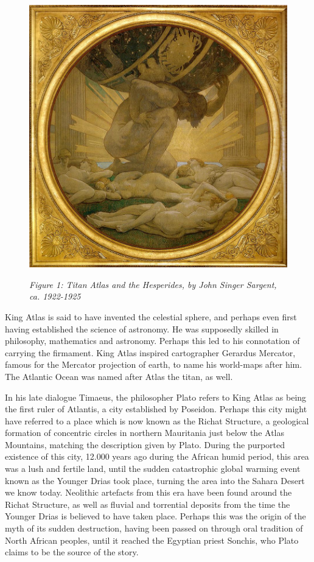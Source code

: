 \begin{figure}
\includegraphics[scale=0.1]{./Images/Atlas.jpeg}
 

\textit{Figure 1: Titan Atlas and the Hesperides, by John Singer Sargent, ca. 1922-1925}
\end{figure}

King Atlas is said to have invented the celestial sphere, and perhaps even first having established the science of astronomy. He was supposedly skilled in philosophy, mathematics and astronomy. Perhaps this led to his connotation of carrying the firmament. King Atlas inspired cartographer Gerardus Mercator, famous for the Mercator projection of earth, to name his world-maps after him. The Atlantic Ocean was named after Atlas the titan, as well.  

In his late dialogue Timaeus, the philosopher Plato refers to King Atlas as being the first ruler of Atlantis, a city established by Poseidon. Perhaps this city might have referred to a place which is now known as the Richat Structure, a geological formation of concentric circles in northern Mauritania just below the Atlas Mountains, matching the description given by Plato. During the purported existence of this city, 12.000 years ago during the African humid period, this area was a lush and fertile land, until the sudden catastrophic global warming event known as the Younger Drias took place, turning the area into the Sahara Desert we know today. Neolithic artefacts from this era have been found  around  the Richat Structure, as well as fluvial and torrential deposits from the time the Younger Drias is believed to have taken place. Perhaps this was the origin of the myth of its sudden destruction, having been passed on through oral tradition of North African peoples, until it reached the Egyptian priest Sonchis, who Plato claims to be the source of the story. 


